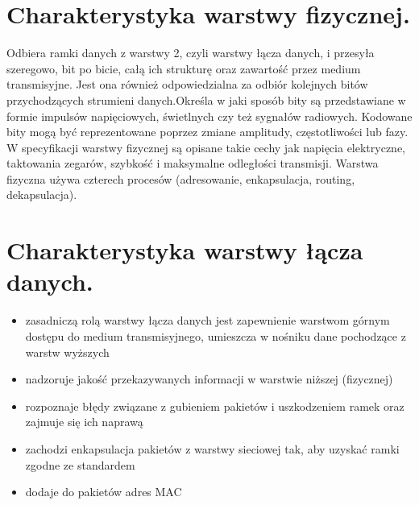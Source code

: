 \documentclass[12pt,a4paper]{article}
\begin{document}
	\section{Charakterystyka warstwy fizycznej.}
	Odbiera ramki danych z warstwy 2, czyli warstwy łącza danych, i przesyła szeregowo, bit po bicie, całą ich strukturę oraz zawartość przez medium transmisyjne. Jest ona również odpowiedzialna za odbiór kolejnych bitów przychodzących strumieni danych.Określa w jaki sposób bity są przedstawiane w formie impulsów napięciowych, świetlnych czy też sygnałów radiowych. Kodowane bity mogą być reprezentowane poprzez zmiane amplitudy, częstotliwości lub fazy.\\	
	W specyfikacji warstwy fizycznej są opisane takie cechy jak napięcia elektryczne, taktowania zegarów, szybkość i maksymalne odległości transmisji. Warstwa fizyczna używa czterech procesów (adresowanie, enkapsulacja, routing, dekapsulacja).

	\section{Charakterystyka warstwy łącza danych.}
	\begin{itemize}
		\item zasadniczą rolą warstwy łącza danych jest zapewnienie warstwom górnym dostępu do medium transmisyjnego, umieszcza w nośniku dane pochodzące z warstw wyższych
		\item nadzoruje jakość przekazywanych informacji w warstwie niższej (fizycznej)
		\item rozpoznaje błędy związane z gubieniem pakietów i uszkodzeniem ramek oraz zajmuje się ich naprawą
		\item zachodzi enkapsulacja pakietów z warstwy sieciowej tak, aby uzyskać ramki zgodne ze standardem
		\item dodaje do pakietów adres MAC
	\end{itemize}
\end{document}

